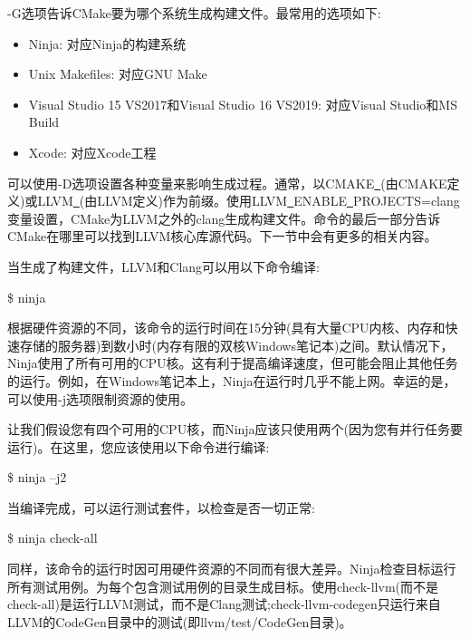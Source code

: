 -G选项告诉CMake要为哪个系统生成构建文件。最常用的选项如下:\par

\begin{itemize}
	\item Ninja: 对应Ninja的构建系统
	\item Unix Makefiles: 对应GNU Make
	\item Visual Studio 15 VS2017和Visual Studio 16 VS2019: 对应Visual Studio和MS Build
	\item Xcode: 对应Xcode工程
\end{itemize}

可以使用-D选项设置各种变量来影响生成过程。通常，以CMAKE\underline{~}(由CMAKE定义)或LLVM\underline{~}(由LLVM定义)作为前缀。使用LLVM\underline{~}ENABLE\underline{~}PROJECTS=clang变量设置，CMake为LLVM之外的clang生成构建文件。命令的最后一部分告诉CMake在哪里可以找到LLVM核心库源代码。下一节中会有更多的相关内容。\par

当生成了构建文件，LLVM和Clang可以用以下命令编译:\par

\begin{tcolorbox}[colback=white,colframe=black]
	\$ ninja
\end{tcolorbox}

根据硬件资源的不同，该命令的运行时间在15分钟(具有大量CPU内核、内存和快速存储的服务器)到数小时(内存有限的双核Windows笔记本)之间。默认情况下，Ninja使用了所有可用的CPU核。这有利于提高编译速度，但可能会阻止其他任务的运行。例如，在Windows笔记本上，Ninja在运行时几乎不能上网。幸运的是，可以使用-j选项限制资源的使用。\par

让我们假设您有四个可用的CPU核，而Ninja应该只使用两个(因为您有并行任务要运行)。在这里，您应该使用以下命令进行编译:\par

\begin{tcolorbox}[colback=white,colframe=black]
	\$ ninja –j2
\end{tcolorbox}

当编译完成，可以运行测试套件，以检查是否一切正常:\par

\begin{tcolorbox}[colback=white,colframe=black]
	\$ ninja check-all
\end{tcolorbox}

同样，该命令的运行时因可用硬件资源的不同而有很大差异。Ninja检查目标运行所有测试用例。为每个包含测试用例的目录生成目标。使用check-llvm(而不是check-all)是运行LLVM测试，而不是Clang测试;check-llvm-codegen只运行来自LLVM的CodeGen目录中的测试(即llvm/test/CodeGen目录)。\par

